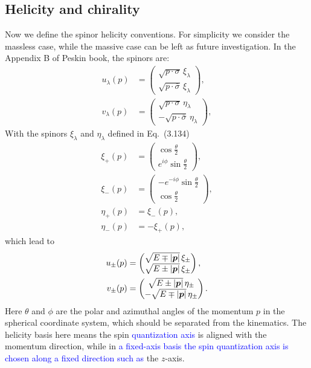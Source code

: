 \documentclass[a4paper,11pt]{article}
\newcommand{\nn}{\nonumber}
\begin{document}
\subsection{Helicity and chirality}
Now we define the spinor helicity conventions. For simplicity we consider the massless case, while the massive case can be left as future investigation.
In the Appendix B of Peskin book, the spinors are:
\begin{align}
    u_\lambda(p) &= \begin{pmatrix} \sqrt{p\cdot\sigma} \, \xi_\lambda \\ \sqrt{p\cdot\bar{\sigma}} \, \xi_\lambda \end{pmatrix}, \\
    v_\lambda(p) &= \begin{pmatrix} \sqrt{p\cdot\sigma} \, \eta_\lambda \\ -\sqrt{p\cdot\bar{\sigma}} \, \eta_\lambda \end{pmatrix},
\end{align}
With the spinors $\xi_\lambda$ and $\eta_\lambda$ defined in Eq.~(3.134)
\begin{align}
    \xi_+(p) &= \begin{pmatrix} \cos\frac{\theta}{2} \\ e^{i\phi}\sin\frac{\theta}{2} \end{pmatrix}, \nn\\
    \xi_-(p) &= \begin{pmatrix} -e^{-i\phi}\sin\frac{\theta}{2} \\ \cos\frac{\theta}{2} \end{pmatrix}, \nn\\
    \eta_+(p) &= \xi_-(p),  \nn\\
    \eta_-(p) &= -\xi_+(p),
\end{align}
which lead to
\begin{align}
    u_\pm(p) &= \begin{pmatrix} \sqrt{E \mp \abs{\bm p}} \, \xi_\pm \\ \sqrt{E \pm \abs{\bm p}} \, \xi_\pm \end{pmatrix}, \\
    v_\pm(p) &= \begin{pmatrix} \sqrt{E \pm \abs{\bm p}} \, \eta_\pm \\ -\sqrt{E \mp \abs{\bm p}} \, \eta_\pm \end{pmatrix}.
\end{align}
Here $\theta$ and $\phi$ are the polar and azimuthal angles of the momentum $p$ in the spherical coordinate system, which should be separated from the kinematics.
The helicity basis here means the spin \textcolor{blue}{quantization axis} is aligned with the momentum direction, while in \textcolor{blue}{a fixed-axis basis the spin quantization axis is chosen along a fixed direction such as} the $z$-axis.
\end{document}
